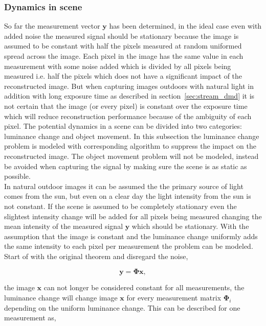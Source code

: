 \subsubsection{Dynamics in scene} %
\label{sec:Dynamics_in_scene}
So far the measurement vector $\mathbf{y}$ has been determined, in the ideal case even with added noise the measured signal should be stationary because the image is assumed to be constant with half the pixels measured at random uniformed spread across the image. Each pixel in the image has the same value in each measurement with some noise added which is divided by all pixels being measured	 i.e. half the pixels which does not have a significant impact of the reconstructed image. But when capturing images outdoors with natural light in addition with long exposure time as described in section~\ref{sec:stream_dmd} it is not certain that the image (or every pixel) is constant over the exposure time which will reduce reconstruction performance because of the ambiguity of each pixel. The potential dynamics in a scene can be divided into two categories: luminance change and object movement. In this subsection the luminance change problem is modeled with corresponding algorithm to suppress the impact on the reconstructed image. The object movement problem will not be modeled, instead be avoided when capturing the signal by making sure the scene is as static as possible.\\[0.1in] 


In natural outdoor images it can be assumed the the primary source of light comes from the sun, but even on a clear day the light intensity from the sun is not constant. If the scene is assumed to be completely stationary even the slightest intensity change will be added for all pixels being measured changing the mean intensity of the measured signal $\mathbf{y}$ which should be stationary. With the assumption that the image is constant and the luminance change uniformly adds the same intensity to each pixel per measurement the problem can be modeled.\\[0.1in]

Start of with the original theorem and disregard the noise, 

\begin{equation}
\mathbf{y} = \mathbf{\Phi}\mathbf{x},
\end{equation}  

the image $\mathbf{x}$ can not longer be considered constant for all measurements, the luminance change will change image $\mathbf{x}$ for every measurement matrix $\mathbf{\Phi}_i$ depending on the uniform luminance change. This can be described for one measurement as,  

